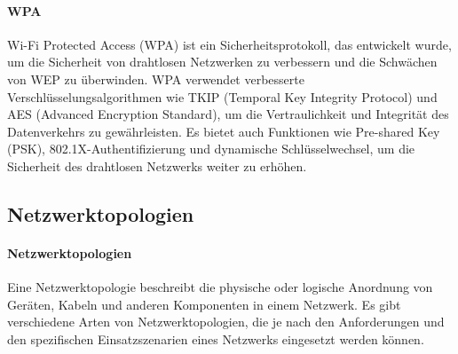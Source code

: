 \paragraph{WPA}

Wi-Fi Protected Access (WPA) ist ein Sicherheitsprotokoll, das entwickelt wurde, um die Sicherheit von drahtlosen Netzwerken zu verbessern und die Schwächen von WEP zu überwinden. WPA verwendet verbesserte Verschlüsselungsalgorithmen wie TKIP (Temporal Key Integrity Protocol) und AES (Advanced Encryption Standard), um die Vertraulichkeit und Integrität des Datenverkehrs zu gewährleisten. Es bietet auch Funktionen wie Pre-shared Key (PSK), 802.1X-Authentifizierung und dynamische Schlüsselwechsel, um die Sicherheit des drahtlosen Netzwerks weiter zu erhöhen.

\subsection{Netzwerktopologien}

\paragraph{Netzwerktopologien}

Eine Netzwerktopologie beschreibt die physische oder logische Anordnung von Geräten, Kabeln und anderen Komponenten in einem Netzwerk. Es gibt verschiedene Arten von Netzwerktopologien, die je nach den Anforderungen und den spezifischen Einsatzszenarien eines Netzwerks eingesetzt werden können.

